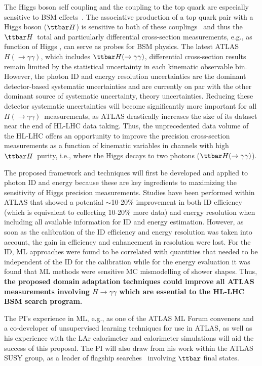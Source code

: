 \documentclass[letter, USenglish, 11pt, subfigure]{article}
\newcommand{\tth}{\ensuremath{\ttbar H}}
\newcommand{\tthyy}{\ensuremath{\ttbar H(\to\gamma\gamma)}}
\newcommand{\hyy}{\ensuremath{H(\to\gamma\gamma)}}
\begin{document}
The Higgs boson self coupling and the coupling to the top quark are especially sensitive to BSM effects~\cite{Agrawal_2020}. The associative production of a top quark pair with a Higgs boson (\tth) is sensitive to both of these couplings~\cite{Maltoni_2017} and thus the \tth\ total and particularly differential cross-section measurements, e.g., as function of Higgs \pt, can serve as probes for BSM physics. The latest ATLAS \hyy, which includes \tthyy, differential cross-section results~\cite{ATLAS_STXS} remain limited by the statistical uncertainty in each kinematic observable bin. However, the photon ID and energy resolution uncertainties are the dominant detector-based systematic uncertainties and are currently on par with the other dominant source of systematic uncertainty, theory uncertainties. Reducing these detector systematic uncertainties will become significantly more important for all \hyy\ measurements, as ATLAS drastically increases the size of its dataset near the end of HL-LHC data taking. Thus, the unprecedented data volume of the HL-LHC offers an opportunity to improve the precision cross-section measurements as a function of kinematic variables in channels with high \tth\ purity, i.e., where the Higgs decays to two photons (\tthyy).

The proposed framework and techniques will first be developed and applied to photon ID and energy because these are key ingredients to maximizing the sensitivity of Higgs precision measurements. Studies have been performed within ATLAS that showed a potential $\sim$10-20\% improvement in both ID efficiency (which is equivalent to collecting 10-20\% more data) and energy resolution when including all available information for ID and energy estimation. However, as soon as the calibration of the ID efficiency and energy resolution was taken into account, the gain in efficiency and enhancement in resolution were lost. For the ID, ML approaches were found to be correlated with quantities that needed to be independent of the ID for the calibration while for the energy evaluation it was found that ML methods were sensitive MC mismodelling of shower shapes. Thus, {\bf the proposed domain adaptation techniques could improve all ATLAS measurements involving $H\to\gamma\gamma$ which are essential to the HL-LHC BSM search program.}

The PI's experience in ML, e.g., as one of the ATLAS ML Forum conveners and a co-developer of unsupervised learning techniques for use in ATLAS, as well as his experience with the LAr calorimeter and calorimeter simulations will aid the success of this proposal. The PI will also draw from his work within the ATLAS SUSY group, as a leader of flagship searches~\cite{stop0L_1,stopRun1,stop0L_2,stop0L_3} involving $\ttbar$ final states. 
\end{document}
